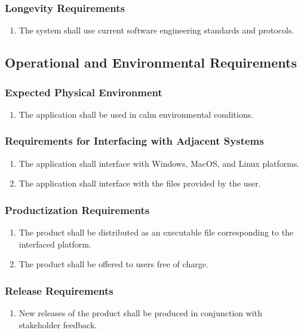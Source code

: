 \documentclass{article}
\begin{document}
\subsubsection{Longevity Requirements}
\begin{enumerate}
    \item The system shall use current software engineering standards and protocols.
\end{enumerate}

\subsection{Operational and Environmental Requirements}
\subsubsection{Expected Physical Environment}
\begin{enumerate}
    \item The application shall be used in calm environmental conditions.
\end{enumerate}

\subsubsection{Requirements for Interfacing with Adjacent Systems}
\begin{enumerate}
    \item The application shall interface with Windows, MacOS, and Linux platforms.
    \item The application shall interface with the files provided by the user.
\end{enumerate}

\subsubsection{Productization Requirements}
\begin{enumerate}
    \item The product shall be distributed as an executable file corresponding to the interfaced platform.
    \item The product shall be offered to users free of charge.
\end{enumerate}

\subsubsection{Release Requirements}
\begin{enumerate}
    \item New releases of the product shall be produced in conjunction with stakeholder feedback.
\end{enumerate}
\end{document}
